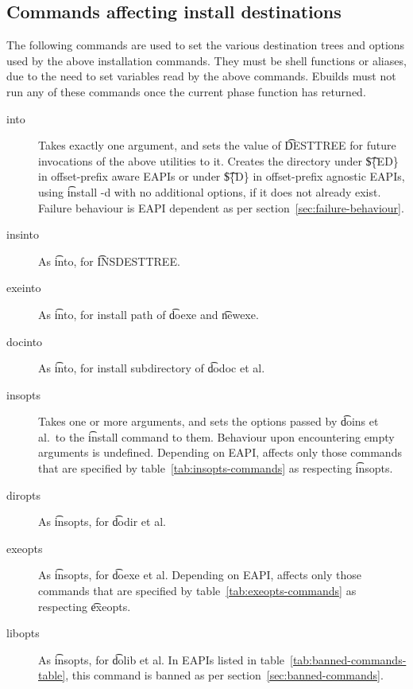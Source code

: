 \subsection{Commands affecting install destinations}
The following commands are used to set the various destination trees and options used by the above
installation commands. They must be shell functions or aliases, due to the need to set variables
read by the above commands. Ebuilds must not run any of these commands once the current phase
function has returned.

\begin{description}

\item[into] Takes exactly one argument, and sets the value of \t{DESTTREE} for future invocations
    of the above utilities to it. Creates the directory under \t{\$\{ED\}} in offset-prefix aware
    EAPIs or under \t{\$\{D\}} in offset-prefix agnostic EAPIs, using \t{install -d} with no
    additional options, if it does not already exist. Failure behaviour is EAPI dependent as per
    section~\ref{sec:failure-behaviour}.

\item[insinto] As \t{into}, for \t{INSDESTTREE}.

\item[exeinto] As \t{into}, for install path of \t{doexe} and \t{newexe}.

\item[docinto] As \t{into}, for install subdirectory of \t{dodoc} et al.

\item[insopts]  Takes one or more arguments, and sets the options passed by
    \t{doins} et al.\ to the \t{install} command to them. Behaviour upon encountering empty
    arguments is undefined. Depending on EAPI, affects only those commands that are specified
    by table~\ref{tab:insopts-commands} as respecting \t{insopts}.

\item[diropts] As \t{insopts}, for \t{dodir} et al.

\item[exeopts]  As \t{insopts}, for \t{doexe} et al. Depending on EAPI,
    affects only those commands that are specified by table~\ref{tab:exeopts-commands}
    as respecting \t{exeopts}.

\item[libopts] As \t{insopts}, for \t{dolib} et al.
    In EAPIs listed in table~\ref{tab:banned-commands-table}, this command is banned as
    per section~\ref{sec:banned-commands}.

\end{description}

